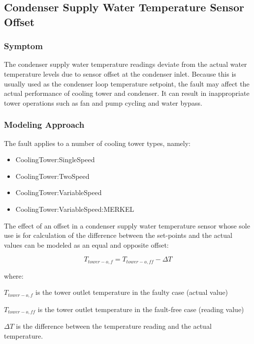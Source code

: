 \subsection{Condenser Supply Water Temperature Sensor Offset}\label{condenser-supply-water-temperature-sensor-offset}

\subsubsection{Symptom}

The condenser supply water temperature readings deviate from the actual water temperature levels due to sensor offset at the condenser inlet. Because this is usually used as the condenser loop temperature setpoint, the fault may affect the actual performance of cooling tower and condenser. It can result in inappropriate tower operations such as fan and pump cycling and water bypass.

\subsubsection{Modeling Approach}

The fault applies to a number of cooling tower types, namely:

\begin{itemize}
\tightlist
\item
  CoolingTower:SingleSpeed
\item
  CoolingTower:TwoSpeed
\item
  CoolingTower:VariableSpeed
\item
  CoolingTower:VariableSpeed:MERKEL
\end{itemize}

The effect of an offset in a condenser supply water temperature sensor whose sole use is for calculation of the difference between the set-points and the actual values can be modeled as an equal and opposite offset:

\begin{equation}
T_{tower-o,f} = T_{tower-o,ff} - \Delta T
\end{equation}

where:

\(T_{tower-o,f}\) is the tower outlet temperature in the faulty case (actual value)

\(T_{tower-o,ff}\) is the tower outlet temperature in the fault-free case (reading value)

\(\Delta T\) is the difference between the temperature reading and the actual temperature.

